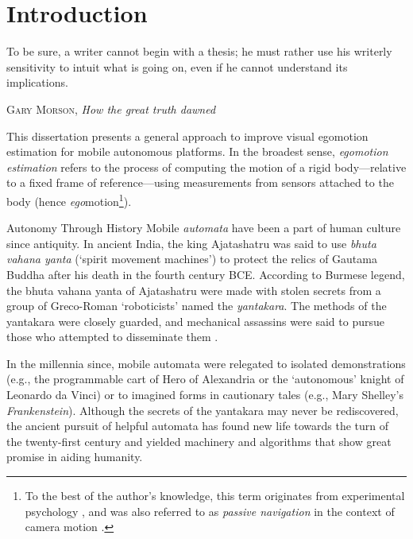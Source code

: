 \chapter{Introduction}
\label{ch:intro}
\epigraph{To be sure, a writer cannot begin with a thesis; he must rather use his writerly sensitivity to intuit what is going on, even if he cannot understand its implications.}{\textsc{Gary Morson}, \textit{How the great truth dawned}}
 





This dissertation presents a general approach to improve visual egomotion estimation for mobile autonomous platforms.  In the broadest sense, \textit{egomotion estimation} refers to the process of computing the motion of a rigid body---relative to a fixed frame of reference---using measurements from sensors attached to the body (hence \textit{ego}motion\footnote{To the best of the author's knowledge, this term originates from experimental psychology \citep{warren1976perception}, and was also referred to as \textit{passive navigation} in the context of camera motion \citep{bruss_passive_1983}.}).  
\begin{remark}{Autonomy Through History}
Mobile \textit{automata} have been a part of human culture since antiquity. In ancient India, the king Ajatashatru was said to use \textit{bhuta vahana yanta} (`spirit movement machines') to protect the relics of Gautama Buddha after his death in the fourth century BCE. According to Burmese legend, the bhuta vahana yanta of Ajatashatru were made with stolen secrets from a group of Greco-Roman `roboticists' named the \textit{yantakara}. The methods of the yantakara were closely guarded, and mechanical assassins were said to pursue those who attempted to disseminate them \citep{MayorGodsRobots2019}.

In the millennia since, mobile automata were relegated to isolated demonstrations (e.g., the programmable cart of Hero of Alexandria or the `autonomous' knight of Leonardo da Vinci) or to imagined forms in cautionary tales (e.g., Mary Shelley's \textit{Frankenstein}). Although the secrets of the yantakara may never be rediscovered, the ancient pursuit of helpful automata has found new life towards the turn of the twenty-first century and yielded machinery and algorithms that show great promise in aiding humanity.
\end{remark}
 
